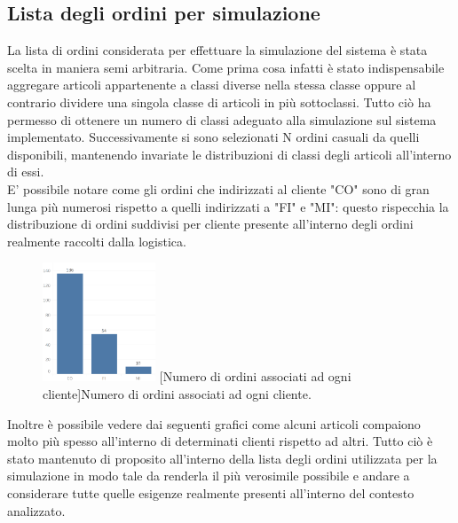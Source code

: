 \documentclass[12pt]{article}
\begin{document}
\subsection{Lista degli ordini per simulazione}
La lista di ordini considerata per effettuare la simulazione del sistema è stata scelta in maniera semi arbitraria. Come prima cosa infatti è stato indispensabile aggregare articoli appartenente a classi diverse nella stessa classe oppure al contrario dividere una singola classe di articoli in più sottoclassi. Tutto ciò ha permesso di ottenere un numero di classi adeguato alla simulazione sul sistema implementato. \newline
Successivamente si sono selezionati N ordini casuali da quelli disponibili, mantenendo invariate le distribuzioni di classi degli articoli all'interno di essi.\\

\noindent E' possibile notare come gli ordini che indirizzati al cliente "CO" sono di gran lunga più numerosi rispetto a quelli indirizzati a "FI" e "MI": questo rispecchia la distribuzione di ordini suddivisi per cliente presente all'interno degli ordini realmente raccolti dalla logistica.

\begin{figure}[ht]
\centering
\includegraphics[width=0.3\textwidth,keepaspectratio]{Figures/Graphics/Orders_simulation.png}
[Numero di ordini associati ad ogni cliente]{Numero di ordini associati ad ogni cliente.}
\label{fig:OrdiniSimulazione}
\end{figure}

\noindent Inoltre è possibile vedere dai seguenti grafici come alcuni articoli compaiono molto più spesso all'interno di determinati clienti rispetto ad altri. 
\noindent Tutto ciò è stato mantenuto di proposito all'interno della lista degli ordini utilizzata per la simulazione in modo tale da renderla il più verosimile possibile e andare a considerare tutte quelle esigenze realmente presenti all'interno del contesto analizzato.
\end{document}

